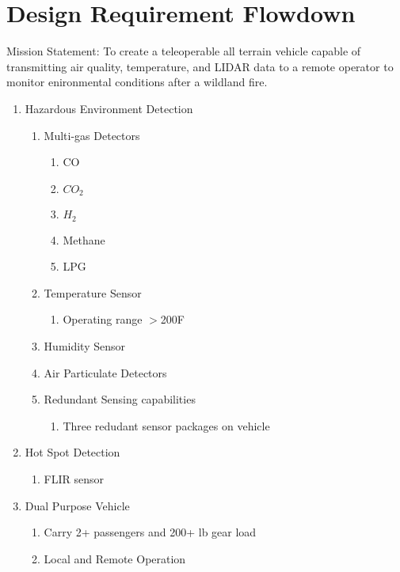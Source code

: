 \chapter{Design Requirement Flowdown} \label{App:DesignRequirements}
Mission Statement: To create a teleoperable all terrain vehicle capable of transmitting air quality, temperature, and LIDAR data to a remote operator to monitor enironmental conditions after a wildland fire.
    \begin{enumerate}
    	\item Hazardous Environment Detection
        \begin{enumerate}
        	\item Multi-gas Detectors
           	\begin{enumerate}
            	\item CO
                \item $CO_2$
                \item $H_2$
                \item Methane
                \item LPG
            \end{enumerate}
            \item Temperature Sensor
            \begin{enumerate}
				\item Operating range $>$200\degree F
            \end{enumerate}
            \item Humidity Sensor
			\item Air Particulate Detectors
            \item Redundant Sensing capabilities
            \begin{enumerate}
        		\item Three redudant sensor packages on vehicle
        	\end{enumerate}
        \end{enumerate}
        \item Hot Spot Detection
        \begin{enumerate}
        	\item FLIR sensor
        \end{enumerate}
        \item Dual Purpose Vehicle
        \begin{enumerate}
        	\item Carry 2+ passengers and 200+ lb gear load
            \item Local and Remote Operation

\end{enumerate}
\end{enumerate}
